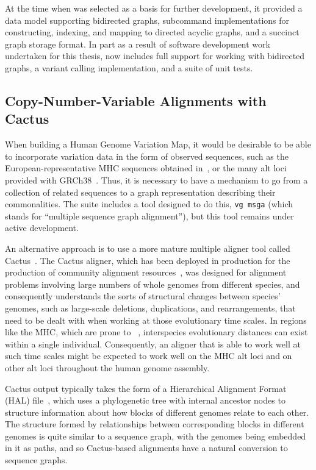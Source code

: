 At the time when \vg was selected as a basis for further development, it provided a data model supporting bidirected graphs, subcommand implementations for constructing, indexing, and mapping to directed acyclic graphs, and a succinct graph storage format. In part as a result of software development work undertaken for this thesis, \vg now includes full support for working with bidirected graphs, a variant calling implementation, and a suite of unit tests.

\subsection{Copy-Number-Variable Alignments with Cactus}

When building a Human Genome Variation Map, it would be desirable to be able to incorporate variation data in the form of observed sequences, such as the European-representative MHC sequences obtained in~\citet{horton2008variation}, or the many alt loci provided with GRCh38~\cite{karolchik2014new}. Thus, it is necessary to have a mechanism to go from a collection of related sequences to a graph representation describing their commonalities. The \vg suite includes a tool designed to do this, \texttt{vg msga} (which stands for ``multiple sequence graph alignment''), but this tool remains under active development.

An alternative approach is to use a more mature multiple aligner tool called Cactus~\cite{paten2011cactus2}. The Cactus aligner, which has been deployed in production for the production of community alignment resources~\cite{howe2015wormbase}, was designed for alignment problems involving large numbers of whole genomes from different species, and consequently understands the sorts of structural changes between species' genomes, such as large-scale deletions, duplications, and rearrangements, that need to be dealt with when working at those evolutionary time scales. In regions like the MHC, which are prone to ~\cite{prufer2012bonobo}, interspecies evolutionary distances can exist within a single individual. Consequently, an aligner that is able to work well at such time scales might be expected to work well on the MHC alt loci and on other alt loci throughout the human genome assembly.

Cactus output typically takes the form of a Hierarchical Alignment Format (HAL) file~\cite{hickey2013hal,howe2015wormbase}, which uses a phylogenetic tree with internal ancestor nodes to structure information about how blocks of different genomes relate to each other. The structure formed by relationships between corresponding blocks in different genomes is quite similar to a sequence graph, with the genomes being embedded in it as paths, and so Cactus-based alignments have a natural conversion to sequence graphs.

